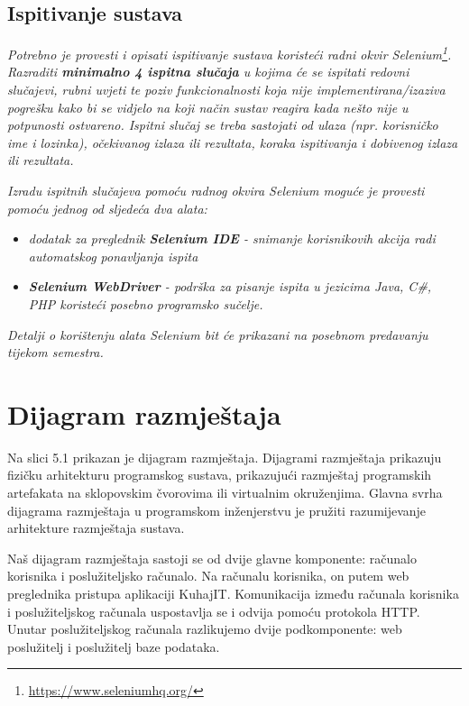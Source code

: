 			
			
			
			\subsection{Ispitivanje sustava}
			
			 \textit{Potrebno je provesti i opisati ispitivanje sustava koristeći radni okvir Selenium\footnote{\url{https://www.seleniumhq.org/}}. Razraditi \textbf{minimalno 4 ispitna slučaja} u kojima će se ispitati redovni slučajevi, rubni uvjeti te poziv funkcionalnosti koja nije implementirana/izaziva pogrešku kako bi se vidjelo na koji način sustav reagira kada nešto nije u potpunosti ostvareno. Ispitni slučaj se treba sastojati od ulaza (npr. korisničko ime i lozinka), očekivanog izlaza ili rezultata, koraka ispitivanja i dobivenog izlaza ili rezultata.\\ }
			 
			 \textit{Izradu ispitnih slučajeva pomoću radnog okvira Selenium moguće je provesti pomoću jednog od sljedeća dva alata:}
			 \begin{itemize}
			 	\item \textit{dodatak za preglednik \textbf{Selenium IDE} - snimanje korisnikovih akcija radi automatskog ponavljanja ispita	}
			 	\item \textit{\textbf{Selenium WebDriver} - podrška za pisanje ispita u jezicima Java, C\#, PHP koristeći posebno programsko sučelje.}
			 \end{itemize}
		 	\textit{Detalji o korištenju alata Selenium bit će prikazani na posebnom predavanju tijekom semestra.}
			
			\eject 
		
		
		\section{Dijagram razmještaja}
			
		
		Na slici 5.1 prikazan je dijagram razmještaja. Dijagrami razmještaja prikazuju fizičku arhitekturu programskog sustava, prikazujući razmještaj programskih artefakata na sklopovskim čvorovima ili virtualnim okruženjima. Glavna svrha dijagrama razmještaja u programskom inženjerstvu je pružiti razumijevanje arhitekture razmještaja sustava.
		
		Naš dijagram razmještaja sastoji se od dvije glavne komponente: računalo korisnika i poslužiteljsko računalo. Na računalu korisnika, on putem web preglednika pristupa aplikaciji KuhajIT. Komunikacija između računala korisnika i poslužiteljskog računala uspostavlja se i odvija pomoću protokola HTTP. Unutar poslužiteljskog računala razlikujemo dvije podkomponente: web poslužitelj i poslužitelj baze podataka.
		
